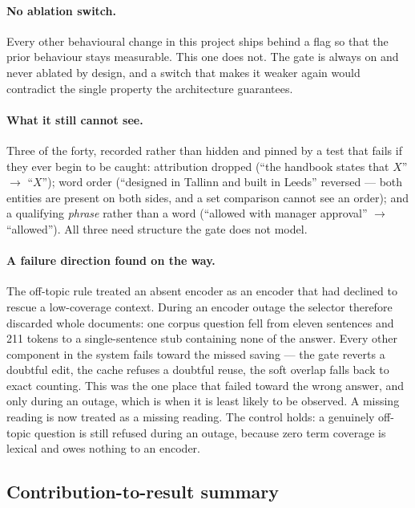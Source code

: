 \documentclass[11pt,a4paper]{article}
\begin{document}
\paragraph{No ablation switch.} Every other behavioural change in this project
ships behind a flag so that the prior behaviour stays measurable. This one does
not. The gate is always on and never ablated by design, and a switch that makes
it weaker again would contradict the single property the architecture
guarantees.

\paragraph{What it still cannot see.} Three of the forty, recorded rather than
hidden and pinned by a test that fails if they ever begin to be caught:
attribution dropped (``the handbook states that $X$'' $\rightarrow$ ``$X$'');
word order (``designed in Tallinn and built in Leeds'' reversed --- both entities
are present on both sides, and a set comparison cannot see an order); and a
qualifying \emph{phrase} rather than a word (``allowed with manager approval''
$\rightarrow$ ``allowed''). All three need structure the gate does not model.

\paragraph{A failure direction found on the way.} The off-topic rule treated an
absent encoder as an encoder that had declined to rescue a low-coverage context.
During an encoder outage the selector therefore discarded whole documents: one
corpus question fell from eleven sentences and 211 tokens to a single-sentence
stub containing none of the answer. Every other component in the system fails
toward the missed saving --- the gate reverts a doubtful edit, the cache refuses
a doubtful reuse, the soft overlap falls back to exact counting. This was the one
place that failed toward the wrong answer, and only during an outage, which is
when it is least likely to be observed. A missing reading is now treated as a
missing reading. The control holds: a genuinely off-topic question is still
refused during an outage, because zero term coverage is lexical and owes nothing
to an encoder.


\subsection{Contribution-to-result summary}
\label{sec:summary}
\end{document}

